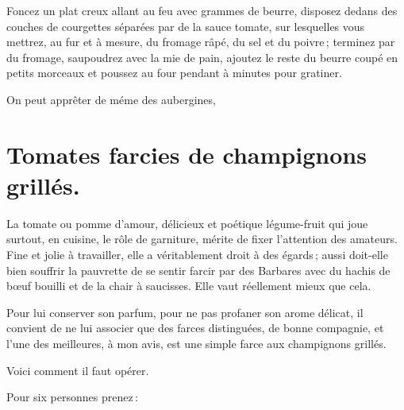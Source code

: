 Foncez un plat creux allant au feu avec {\mmm} grammes de beurre,
disposez dedans des couches de courgettes séparées par de la sauce tomate, sur
lesquelles vous mettrez, au fur et à mesure, du fromage râpé, du sel et du
poivre ; terminez par du fromage, saupoudrez avec la mie de pain, ajoutez le
reste du beurre coupé en petits morceaux et poussez au four pendant {\mmm}
à {\mmm} minutes pour gratiner.

\sk

On peut apprêter de méme des aubergines,

\section*{\centering Tomates farcies de champignons grillés.}
{}
\label{pg0766} \hypertarget{p0766}{}

La tomate ou pomme d'amour, délicieux et poétique légume-fruit qui joue
surtout, en cuisine, le rôle de garniture, mérite de fixer l'attention des
amateurs. Fine et jolie à travailler, elle a véritablement droit à des égards ;
aussi doit-elle bien souffrir la pauvrette de se sentir farcir par des Barbares
avec du hachis de bœuf bouilli et de la chair à saucisses. Elle vaut réellement
mieux que cela.

Pour lui conserver son parfum, pour ne pas profaner son arome délicat, il
convient de ne lui associer que des farces distinguées, de bonne compagnie, et
l'une des meilleures, à mon avis, est une simple farce aux champignons grillés.

Voici comment il faut opérer.

\medskip

Pour six personnes prenez :

